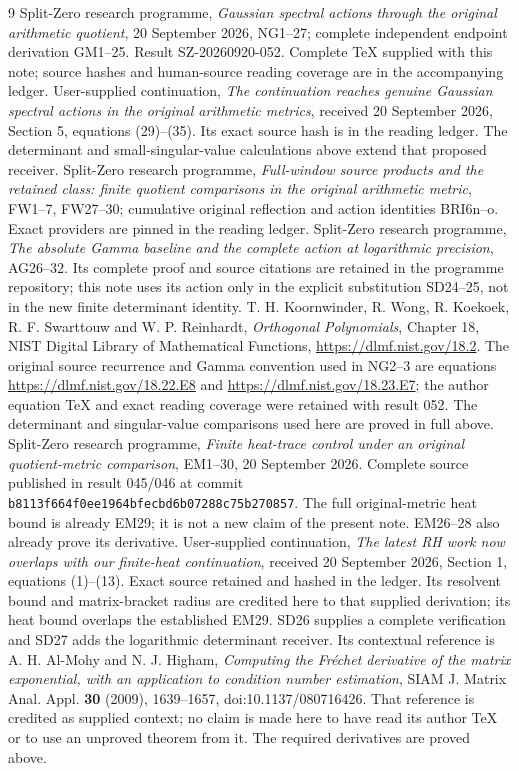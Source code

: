 \documentclass[11pt]{article}
\begin{document}
\begin{thebibliography}{9}
 Split-Zero research programme, \emph{Gaussian spectral
actions through the original arithmetic quotient}, 20 September 2026,
NG1--27; complete independent endpoint derivation GM1--25. Result
SZ-20260920-052. Complete TeX supplied with this note; source hashes and
human-source reading coverage are in the accompanying ledger.
 User-supplied continuation, \emph{The continuation
reaches genuine Gaussian spectral actions in the original arithmetic
metrics}, received 20 September 2026, Section 5, equations (29)--(35).
Its exact source hash is in the reading ledger. The determinant and
small-singular-value calculations above extend that proposed receiver.
 Split-Zero research programme, \emph{Full-window source
products and the retained class: finite quotient comparisons in the
original arithmetic metric}, FW1--7, FW27--30; cumulative original
reflection and action identities BRI6n--o. Exact providers are pinned
in the reading ledger.
 Split-Zero research programme, \emph{The absolute Gamma
baseline and the complete action at logarithmic precision}, AG26--32.
Its complete proof and source citations are retained in the programme
repository; this note uses its action only in the explicit substitution
SD24--25, not in the new finite determinant identity.
 T. H. Koornwinder, R. Wong, R. Koekoek,
R. F. Swarttouw and W. P. Reinhardt, \emph{Orthogonal Polynomials},
Chapter 18, NIST Digital Library of Mathematical Functions,
\url{https://dlmf.nist.gov/18.2}. The original source recurrence and
Gamma convention used in NG2--3 are equations
\url{https://dlmf.nist.gov/18.22.E8} and
\url{https://dlmf.nist.gov/18.23.E7}; the author equation TeX and exact
reading coverage were retained with result 052. The determinant and
singular-value comparisons used here are proved in full above.
 Split-Zero research programme, \emph{Finite heat-trace
control under an original quotient-metric comparison}, EM1--30,
20 September 2026. Complete source published in result 045/046 at
commit \nolinkurl{b8113f664f0ee1964bfecbd6b07288c75b270857}.
The full original-metric heat bound is already EM29; it is not a new
claim of the present note. EM26--28 also already prove its derivative.
 User-supplied continuation, \emph{The latest RH
work now overlaps with our finite-heat continuation}, received
20 September 2026, Section 1, equations (1)--(13). Exact source retained
and hashed in the ledger. Its resolvent bound and matrix-bracket radius
are credited here to that supplied derivation; its heat bound overlaps
the established EM29. SD26 supplies a complete verification and SD27 adds the logarithmic
determinant receiver. Its contextual reference is A. H. Al-Mohy and
N. J. Higham, \emph{Computing the Fr\'echet derivative of the matrix
exponential, with an application to condition number estimation},
SIAM J. Matrix Anal. Appl. \textbf{30} (2009), 1639--1657,
doi:10.1137/080716426. That reference is credited as supplied context;
no claim is made here to have read its author TeX or to use an unproved
theorem from it. The required derivatives are proved above.
\end{thebibliography}
\end{document}
